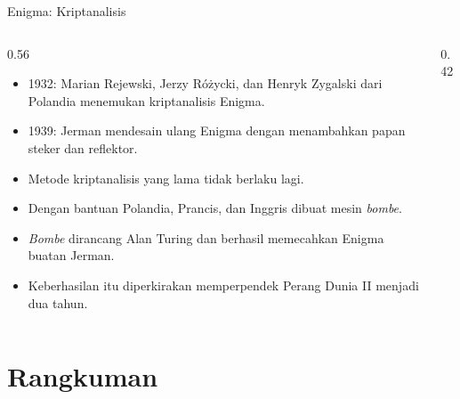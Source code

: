 \documentclass[aspectratio=169,11pt]{beamer}
\begin{document}
\begin{frame}{Enigma: Kriptanalisis}
    \begin{columns}[T,onlytextwidth]
        \begin{column}{0.56\textwidth}
            \footnotesize
            \begin{itemize}
                \item 1932: Marian Rejewski, Jerzy R\'o\.zycki, dan Henryk
                      Zygalski dari Polandia menemukan kriptanalisis Enigma.
                \item 1939: Jerman mendesain ulang Enigma dengan menambahkan
                      papan steker dan reflektor.
                \item Metode kriptanalisis yang lama tidak berlaku lagi.
                \item Dengan bantuan Polandia, Prancis, dan Inggris dibuat
                      mesin \textit{bombe}.
                \item \textit{Bombe} dirancang Alan Turing dan berhasil
                      memecahkan Enigma buatan Jerman.
                \item Keberhasilan itu diperkirakan memperpendek Perang Dunia
                      II menjadi dua tahun.
            \end{itemize}
        \end{column}
        \begin{column}{0.42\textwidth}
            \centering
        \end{column}
    \end{columns}
\end{frame}

\section{Rangkuman}
\end{document}
